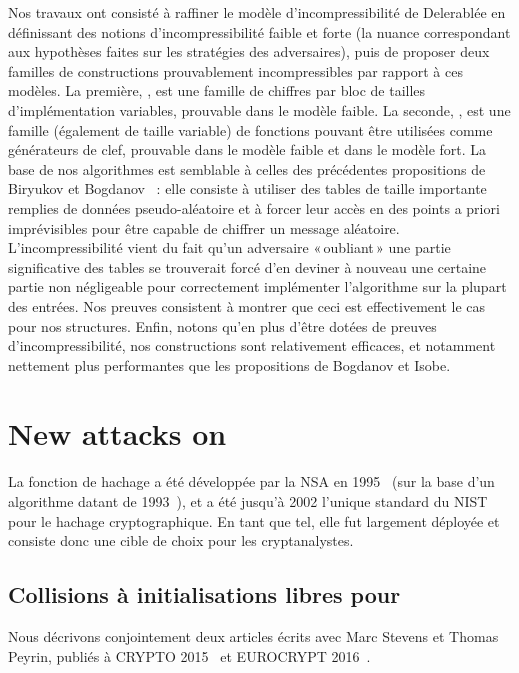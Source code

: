 Nos travaux ont consisté à raffiner le modèle d'incompressibilité de Delerablée \etal en définissant des notions d'incompressibilité faible et forte
(la nuance  correspondant aux hypothèses faites sur les stratégies des adversaires), puis de proposer deux familles de constructions
prouvablement incompressibles par rapport à ces modèles. La première, \pc, est une famille de chiffres par bloc de tailles d'implémentation variables, prouvable dans le modèle
faible. La seconde, \cdb, est une famille (également de taille variable) de fonctions
pouvant être utilisées comme générateurs de clef, prouvable dans le modèle faible et dans le modèle fort. La base de nos algorithmes est semblable à celles des précédentes propositions de Biryukov \etal
et Bogdanov \etal~: elle consiste à utiliser des tables de taille importante remplies de données pseudo-aléatoire et à forcer leur accès en des points a priori imprévisibles pour être capable de
chiffrer un message aléatoire. L'incompressibilité vient du fait qu'un adversaire «\,oubliant\,» une partie significative des tables se trouverait forcé d'en deviner à nouveau une certaine partie
non négligeable
pour correctement implémenter l'algorithme sur la plupart des entrées. Nos preuves consistent à montrer que ceci est effectivement le cas pour nos structures. Enfin, notons qu'en plus d'être
dotées de preuves d'incompressibilité, nos constructions sont relativement efficaces, et notamment nettement plus performantes que les propositions de Bogdanov et Isobe.

\section[Nouvelles attaques sur la fonction de hachage \shaone]{New attacks on \shaone}

La fonction de hachage \shaone a été développée par la NSA en 1995~\cite{Nist-SHA1} (sur la base d'un algorithme datant de 1993~\cite{Nist-SHA0}), et a été jusqu'à 2002 l'unique standard du NIST pour
le hachage cryptographique. En tant que tel, elle fut largement déployée et consiste donc une cible de choix pour les cryptanalystes.

\subsection{Collisions à initialisations libres pour \shaone \cite{DBLP:conf/crypto/KarpmanPS15,DBLP:conf/eurocrypt/StevensKP16}}

Nous décrivons conjointement deux articles écrits avec Marc Stevens et Thomas Peyrin, publiés à CRYPTO 2015~\cite{DBLP:conf/crypto/KarpmanPS15} et EUROCRYPT 2016~\cite{DBLP:conf/eurocrypt/StevensKP16}.

